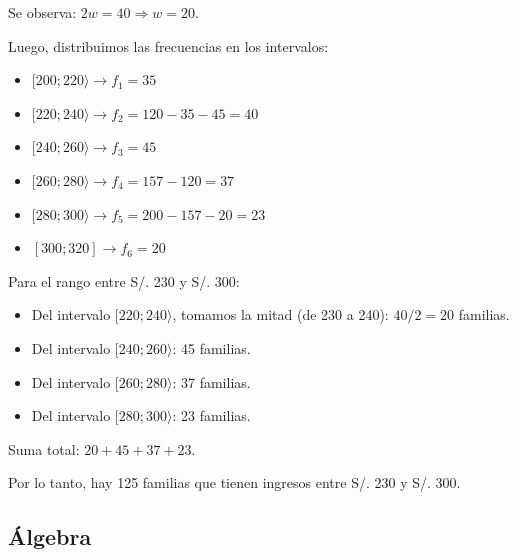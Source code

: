\begin{enumerate}
	Se observa: $2w = 40 \Rightarrow w = 20$.
	
	Luego, distribuimos las frecuencias en los intervalos:
	\begin{itemize}
		\item $[200; 220\rangle \rightarrow f_1 = 35$
		\item $[220; 240\rangle \rightarrow f_2 = 120 - 35 - 45 = 40$
		\item $[240; 260\rangle \rightarrow f_3 = 45$
		\item $[260; 280\rangle \rightarrow f_4 = 157 - 120 = 37$
		\item $[280; 300\rangle \rightarrow f_5 = 200 - 157 - 20 = 23$
		\item $[300; 320] \rightarrow f_6 = 20$
	\end{itemize}
	
	Para el rango entre S/. 230 y S/. 300:
	\begin{itemize}
		\item Del intervalo $[220; 240\rangle$, tomamos la mitad (de 230 a 240): $40 / 2 = 20$ familias.
		\item Del intervalo $[240; 260\rangle$: 45 familias.
		\item Del intervalo $[260; 280\rangle$: 37 familias.
		\item Del intervalo $[280; 300\rangle$: 23 familias.
	\end{itemize}
	
	Suma total: $20 + 45 + 37 + 23 $.
	
	Por lo tanto, hay 125 familias que tienen ingresos entre S/. 230 y S/. 300.
	
	

	
	\vspace{6mm}

\end{enumerate}




\subsection*{Álgebra}


